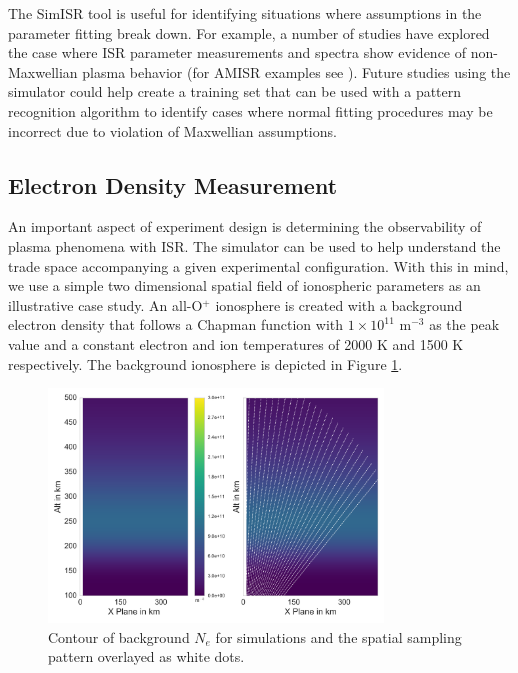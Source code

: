 The SimISR tool is useful for identifying situations where assumptions in the parameter fitting break down. For example, a number of studies have explored the case where ISR parameter measurements and spectra show evidence of non-Maxwellian plasma behavior (for AMISR examples see \citet{Akbari:2012dz,Akbari:2015fv}). Future studies using the simulator could help create a training set that can be used with a pattern recognition algorithm to identify cases where normal fitting procedures may be incorrect due to violation of Maxwellian assumptions.

\subsection{Electron Density Measurement}
An important aspect of experiment design is determining the observability of plasma phenomena with ISR. The simulator can be used to help understand the trade space accompanying a given experimental configuration. With this in mind, we use a simple two dimensional spatial field of ionospheric parameters as an illustrative case study. An all-O$^+$ ionosphere is created with a background electron density that follows a Chapman function with $1\times10^{11}$ m$^{-3}$ as the peak value and a constant electron and ion temperatures of 2000 K and 1500 K respectively. The background ionosphere is depicted in Figure \ref{fig:backgroundnsamp}.

\begin{figure}[!t]
\centering
\includegraphics[width=3.5in]{backgroundandsamp}
\caption{Contour of background $N_e$ for simulations and the spatial sampling pattern overlayed as white dots.}
\label{fig:backgroundnsamp}
\end{figure}

